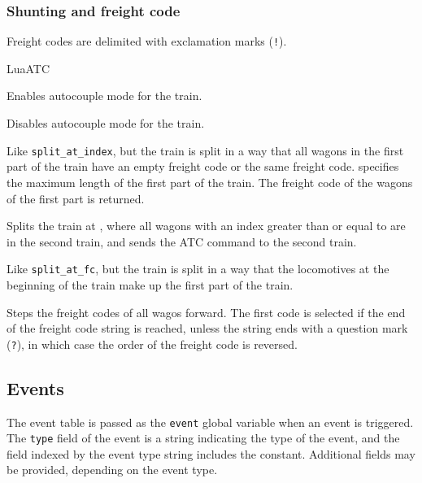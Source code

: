 \subsubsection{Shunting and freight code}\label{s:freightcode}
Freight codes are delimited with exclamation marks (\texttt{!}).
\begin{apidoc}{LuaATC}
\item {} Enables autocouple mode for the train.
\item {} Disables autocouple mode for the train.
\item {} Like \texttt{split\_at\_index}, but the train is split in a way that all wagons in the first part of the train have an empty freight code or the same freight code.  specifies the maximum length of the first part of the train. The freight code of the wagons of the first part is returned.
\item {} Splits the train at , where all wagons with an index greater than or equal to  are in the second train, and sends the ATC command  to the second train.
\item {} Like \texttt{split\_at\_fc}, but the train is split in a way that the locomotives at the beginning of the train make up the first part of the train.
\item {} Steps the freight codes of all wagos forward. The first code is selected if the end of the freight code string is reached, unless the string ends with a question mark (\texttt{?}), in which case the order of the freight code is reversed.
\end{apidoc}

\subsection{Events}
The event table is passed as the \texttt{event} global variable when an event is triggered. The \texttt{type} field of the event is a string indicating the type of the event, and the field indexed by the event type string includes the \luatrue{} constant. Additional fields may be provided, depending on the event type.

